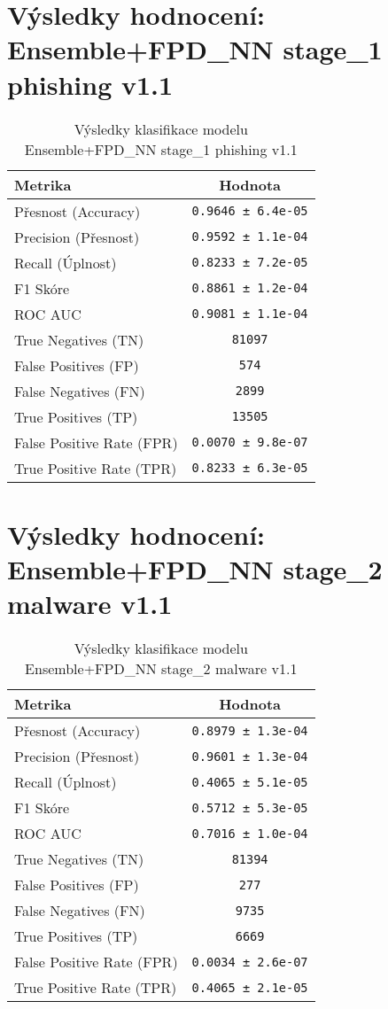 \section*{Výsledky hodnocení: Ensemble+FPD_NN stage_1 phishing v1.1}
\begin{table}[h!]
\centering
\begin{tabular}{|l|c|}
\hline
\textbf{Metrika} & \textbf{Hodnota} \\
\hline
Přesnost (Accuracy) & \texttt{0.9646 ± 6.4e-05} \\
Precision (Přesnost) & \texttt{0.9592 ± 1.1e-04} \\
Recall (Úplnost) & \texttt{0.8233 ± 7.2e-05} \\
F1 Skóre & \texttt{0.8861 ± 1.2e-04} \\
ROC AUC & \texttt{0.9081 ± 1.1e-04} \\
True Negatives (TN) & \texttt{81097} \\
False Positives (FP) & \texttt{574} \\
False Negatives (FN) & \texttt{2899} \\
True Positives (TP) & \texttt{13505} \\
False Positive Rate (FPR) & \texttt{0.0070 ± 9.8e-07} \\
True Positive Rate (TPR) & \texttt{0.8233 ± 6.3e-05} \\
\hline
\end{tabular}
\caption{Výsledky klasifikace modelu Ensemble+FPD_NN stage_1 phishing v1.1}
\label{tab:phishing_ensemble+fpd_nn}
\end{table}

\section*{Výsledky hodnocení: Ensemble+FPD_NN stage_2 malware v1.1}
\begin{table}[h!]
\centering
\begin{tabular}{|l|c|}
\hline
\textbf{Metrika} & \textbf{Hodnota} \\
\hline
Přesnost (Accuracy) & \texttt{0.8979 ± 1.3e-04} \\
Precision (Přesnost) & \texttt{0.9601 ± 1.3e-04} \\
Recall (Úplnost) & \texttt{0.4065 ± 5.1e-05} \\
F1 Skóre & \texttt{0.5712 ± 5.3e-05} \\
ROC AUC & \texttt{0.7016 ± 1.0e-04} \\
True Negatives (TN) & \texttt{81394} \\
False Positives (FP) & \texttt{277} \\
False Negatives (FN) & \texttt{9735} \\
True Positives (TP) & \texttt{6669} \\
False Positive Rate (FPR) & \texttt{0.0034 ± 2.6e-07} \\
True Positive Rate (TPR) & \texttt{0.4065 ± 2.1e-05} \\
\hline
\end{tabular}
\caption{Výsledky klasifikace modelu Ensemble+FPD_NN stage_2 malware v1.1}
\label{tab:malware_ensemble+fpd_nn}
\end{table}

